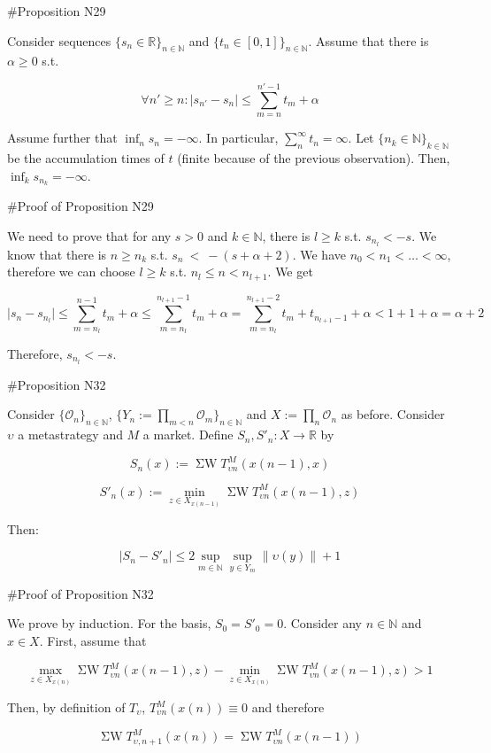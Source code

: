 \documentclass[a4paper]{article}
\newcommand{\Nats}{\mathbb{N}}
\newcommand{\Reals}{\mathbb{R}}
\newcommand{\Sq}[2]{\{#1\}_{#2 \in \Nats}}
\newcommand{\Sqn}[1]{\Sq{#1}{n}}
\newcommand{\Abs}[1]{\lvert #1 \rvert}
\newcommand{\Norm}[1]{\lVert #1 \rVert}
\newcommand{\Ob}{\mathcal{O}}
\newcommand{\SW}{\operatorname{\Sigma W}}
\begin{document}
\#Proposition N29

Consider sequences ${\{s_n \in \Reals\}_{n \in \Nats}}$ and ${\{t_n \in [0,1]\}_{n \in \Nats}}$. Assume that there is ${\alpha \geq 0}$ s.t.

$${\forall n' \geq n: \Abs{s_{n'}-s_n} \leq \sum_{m=n}^{n'-1} t_m + \alpha}$$

Assume further that ${\inf_n s_n = -\infty}$. In particular, ${\sum_n^\infty t_n = \infty}$. Let ${\{n_k \in \Nats\}_{k \in \Nats}}$ be the accumulation times of ${t}$ (finite because of the previous observation).  Then, ${\inf_k s_{n_k} = -\infty}$.

\#Proof of Proposition N29

We need to prove that for any ${s > 0}$ and ${k \in \Nats}$, there is ${l \geq k}$ s.t. ${s_{n_l} < -s}$. We know that there is ${n \geq n_k}$ s.t. ${s_n\ <\ -(s+\alpha+2)}$. We have ${n_0 < n_1 < \ldots < \infty}$, therefore we can choose ${l \geq k}$ s.t. ${n_l \leq n < n_{l+1}}$. We get

$$\Abs{s_n-s_{n_l}} \leq \sum_{m=n_l}^{n - 1} t_m + \alpha \leq \sum_{m=n_l}^{n_{l+1} - 1} t_m  + \alpha = \sum_{m=n_l}^{n_{l+1} - 2} t_m + t_{n_{l+1}-1} + \alpha < 1 + 1  + \alpha = \alpha + 2$$

Therefore, ${s_{n_l} < -s}$.

\#Proposition N32

Consider ${\Sqn{\Ob_n}}$, ${\Sqn{Y_n:=\prod_{m < n} \Ob_m}}$ and ${X:=\prod_n \Ob_n}$ as before. Consider ${\upsilon}$ a metastrategy and ${M}$ a market. Define ${S_n,S'_n: X \rightarrow \Reals}$ by 

$$S_n(x):= \SW T^M_{\upsilon n}(x(n-1),x)$$

$$S'_n(x):= \min_{z \in X_{x(n-1)}} \SW T^M_{\upsilon n}(x(n-1),z)$$

Then: 

$${\Abs{S_n-S'_n} \leq 2 \sup_{m \in \Nats} \sup_{y \in Y_m} \Norm{\upsilon(y)}} + 1$$

\#Proof of Proposition N32

We prove by induction. For the basis, $S_0=S'_0=0$. Consider any ${n \in \Nats}$ and ${x \in X}$. First, assume that

$$\max_{z \in X_{x(n)}} \SW T^M_{\upsilon n}(x(n-1),z)-\min_{z \in X_{x(n)}} \SW T^M_{\upsilon n}(x(n-1),z) > 1$$

Then, by definition of ${T_\upsilon}$, ${T^M_{\upsilon n}}(x(n)) \equiv 0$ and therefore

$$\SW T^M_{\upsilon,n+1}(x(n))=\SW T^M_{\upsilon n}(x(n-1))$$
\end{document}
